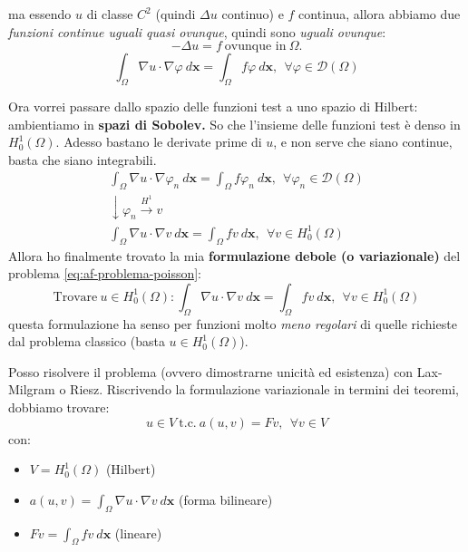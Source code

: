 \documentclass[10pt,a4paper,twoside,openright]{book}
\newcommand{\x}{\mathbf{x}}
\begin{document}
\begin{itemize}
{	      	ma essendo $\displaystyle u$ di classe $\displaystyle C^{2}$ (quindi $\displaystyle \Delta u$ continuo) e $\displaystyle f$ continua, allora abbiamo due \textit{funzioni continue uguali quasi ovunque}, quindi sono \textit{uguali ovunque}:
	      	\begin{equation*}
	      		-\Delta u=f\ \text{ovunque in} \ \Omega .
	      	\end{equation*}}
	      \begin{equation}
	      	\boxed{\int _{\Omega } \nabla u\cdotp \nabla \varphi \ d\x =\int _{\Omega } f\varphi \ d\x ,\ \ \forall \varphi \in \mathcal{D}( \Omega )}
	      \end{equation}
\end{itemize}

Ora vorrei passare dallo spazio delle funzioni test a uno spazio di Hilbert: ambientiamo in \textbf{spazi di Sobolev. }So che l'insieme delle funzioni test è denso in $\displaystyle H_{0}^{1}( \Omega )$. Adesso bastano le derivate prime di $\displaystyle u$, e non serve che siano continue, basta che siano integrabili.
\begin{gather*}
	\int _{\Omega } \nabla u\cdotp \nabla \varphi _{n} \ d\x =\int _{\Omega } f\varphi _{n} \ d\x ,\ \ \forall \varphi _{n} \in \mathcal{D}( \Omega )\\
	\downarrow \varphi _{n}\xrightarrow{H^{1}} v\\
	\int _{\Omega } \nabla u\cdotp \nabla v\ d\x =\int _{\Omega } fv\ d\x ,\ \ \forall v\in H_{0}^{1}( \Omega )
\end{gather*}
Allora ho finalmente trovato la mia \textbf{formulazione debole (o variazionale)} del problema \eqref{eq:af-problema-poisson}: 
\begin{equation}
	\boxed{\text{Trovare} \ u\in H_{0}^{1}( \Omega ) :\int _{\Omega } \nabla u\cdotp \nabla v\ d\x =\int _{\Omega } fv\ d\x ,\ \ \forall v\in H_{0}^{1}( \Omega )}
\end{equation}
questa formulazione ha senso per funzioni molto \textit{meno regolari} di quelle richieste dal problema classico (basta $\displaystyle u\in H_{0}^{1}( \Omega )$).

Posso risolvere il problema (ovvero dimostrarne unicità ed esistenza) con Lax-Milgram o Riesz. Riscrivendo la formulazione variazionale in termini dei teoremi, dobbiamo trovare:
\begin{equation*}
	u\in V\ \text{t.c.} \ a( u,v) =Fv,\ \ \forall v\in V
\end{equation*}
con:
\begin{itemize}
	\item $\displaystyle V=H_{0}^{1}( \Omega )$ (Hilbert)
	\item $\displaystyle a( u,v) =\int _{\Omega } \nabla u\cdotp \nabla v\ d\x$ (forma bilineare)
	\item $\displaystyle Fv=\int _{\Omega } fv\ d\x$ (lineare)
\end{itemize}
\end{document}
